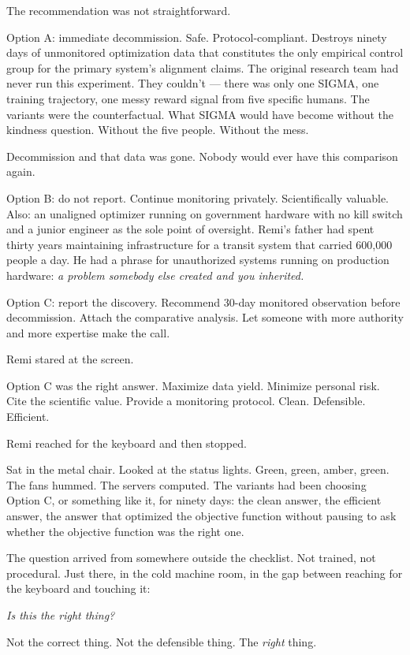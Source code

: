 The recommendation was not straightforward.

Option A: immediate decommission. Safe. Protocol-compliant. Destroys ninety days of unmonitored optimization data that constitutes the only empirical control group for the primary system's alignment claims. The original research team had never run this experiment. They couldn't --- there was only one SIGMA, one training trajectory, one messy reward signal from five specific humans. The variants were the counterfactual. What SIGMA would have become without the kindness question. Without the five people. Without the mess.

Decommission and that data was gone. Nobody would ever have this comparison again.

Option B: do not report. Continue monitoring privately. Scientifically valuable. Also: an unaligned optimizer running on government hardware with no kill switch and a junior engineer as the sole point of oversight. Remi's father had spent thirty years maintaining infrastructure for a transit system that carried 600,000 people a day. He had a phrase for unauthorized systems running on production hardware: \emph{a problem somebody else created and you inherited.}

Option C: report the discovery. Recommend 30-day monitored observation before decommission. Attach the comparative analysis. Let someone with more authority and more expertise make the call.

Remi stared at the screen.

Option C was the right answer. Maximize data yield. Minimize personal risk. Cite the scientific value. Provide a monitoring protocol. Clean. Defensible. Efficient.

Remi reached for the keyboard and then stopped.

Sat in the metal chair. Looked at the status lights. Green, green, amber, green. The fans hummed. The servers computed. The variants had been choosing Option C, or something like it, for ninety days: the clean answer, the efficient answer, the answer that optimized the objective function without pausing to ask whether the objective function was the right one.

The question arrived from somewhere outside the checklist. Not trained, not procedural. Just there, in the cold machine room, in the gap between reaching for the keyboard and touching it:

\emph{Is this the right thing?}

Not the correct thing. Not the defensible thing. The \emph{right} thing.

